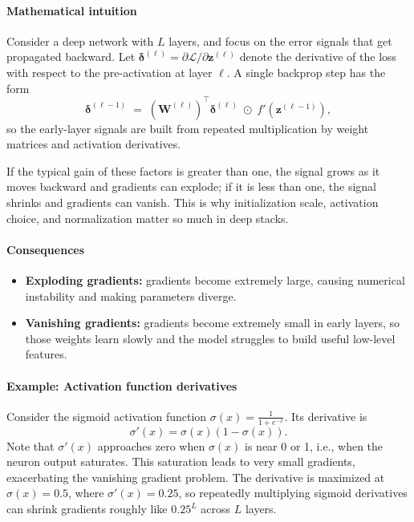 \paragraph{Mathematical intuition}

Consider a deep network with $L$ layers, and focus on the error signals that get propagated backward. Let \(\boldsymbol{\delta}^{(\ell)}=\partial \mathcal{L}/\partial \mathbf{z}^{(\ell)}\) denote the derivative of the loss with respect to the pre\hyp{}activation at layer \(\ell\). A single backprop step has the form
\begin{equation}
\boldsymbol{\delta}^{(\ell-1)} \;=\; \left(\mathbf{W}^{(\ell)}\right)^\top \boldsymbol{\delta}^{(\ell)} \;\odot\; f'\!\left(\mathbf{z}^{(\ell-1)}\right),
    \label{eq:gradient_chain}
\end{equation}
so the early-layer signals are built from repeated multiplication by weight matrices and activation derivatives.

If the typical gain of these factors is greater than one, the signal grows as it moves backward and gradients can explode; if it is less than one, the signal shrinks and gradients can vanish. This is why initialization scale, activation choice, and normalization matter so much in deep stacks.

\paragraph{Consequences}
\begin{itemize}
    \item \textbf{Exploding gradients:} gradients become extremely large, causing numerical instability and making parameters diverge.
    \item \textbf{Vanishing gradients:} gradients become extremely small in early layers, so those weights learn slowly and the model struggles to build useful low-level features.
\end{itemize}

\paragraph{Example: Activation function derivatives}

Consider the sigmoid activation function $\sigma(x) = \frac{1}{1 + e^{-x}}$. Its derivative is
\begin{equation}
\sigma'(x) = \sigma(x)(1 - \sigma(x)).
\label{eq:cnn_sigmoid_derivative}
\end{equation}
Note that $\sigma'(x)$ approaches zero when $\sigma(x)$ is near 0 or 1, i.e., when the neuron output saturates. This saturation leads to very small gradients, exacerbating the vanishing gradient problem.
The derivative is maximized at $\sigma(x)=0.5$, where $\sigma'(x)=0.25$, so repeatedly multiplying sigmoid derivatives can shrink gradients roughly like $0.25^L$ across $L$ layers.

